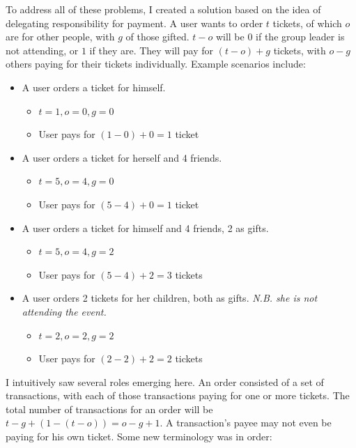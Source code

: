 \documentclass[12pt,a4paper]{bhamdissertation}
\begin{document}
To address all of these problems, I created a solution based on the idea of delegating responsibility for payment. A user wants to order $t$ tickets, of which $o$ are for other people, with $g$ of those gifted. $t - o$ will be $0$ if the group leader is not attending, or $1$ if they are. They will pay for $(t - o) + g$ tickets, with $o - g$ others paying for their tickets individually. Example scenarios include:

\begin{itemize}
    \item A user orders a ticket for himself.
    \begin{itemize}
        \item $t = 1, o = 0, g = 0$
        \item User pays for $(1 - 0) + 0 = 1$ ticket
    \end{itemize}
    \item A user orders a ticket for herself and 4 friends.
    \begin{itemize}
        \item $t = 5, o = 4, g = 0$
        \item User pays for $(5 - 4) + 0 = 1$ ticket
    \end{itemize}
    \item A user orders a ticket for himself and 4 friends, 2 as gifts.
    \begin{itemize}
        \item $t = 5, o = 4, g = 2$
        \item User pays for $(5 - 4) + 2 = 3$ tickets
    \end{itemize}
    \item A user orders 2 tickets for her children, both as gifts.
    \textit{N.B. she is not attending the event.}
    \begin{itemize}
        \item $t = 2, o = 2, g = 2$
        \item User pays for $(2 - 2) + 2 = 2$ tickets
    \end{itemize}
\end{itemize}

I intuitively saw several roles emerging here. An order consisted of a set of transactions, with each of those transactions paying for one or more tickets. The total number of transactions for an order will be $t - g + (1 - (t - o)) = o - g + 1$. A transaction's payee may not even be paying for his own ticket. Some new terminology was in order:
\end{document}
